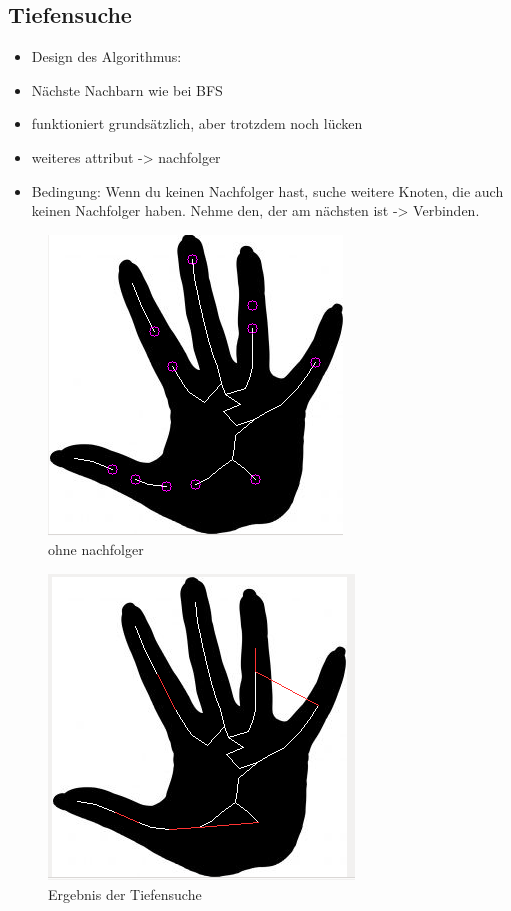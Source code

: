 \subsection{Tiefensuche}
\begin{itemize}
\item Design des Algorithmus:
\item Nächste Nachbarn wie bei BFS
\item funktioniert grundsätzlich, aber trotzdem noch lücken
\item weiteres attribut -> nachfolger
\item Bedingung: Wenn du keinen Nachfolger hast, suche weitere Knoten, die auch keinen Nachfolger haben. Nehme den, der
am nächsten ist -> Verbinden.
\end{itemize}
\begin{figure}
\centering
\includegraphics[width=0.4\linewidth]{./fig/hand-punkte-ohne-nachfolger}
\caption{ohne nachfolger}
\label{fig:hand-punkte-ohne-nachfolger}
\end{figure}
\label{subsec:tiefensuche}
\begin{figure}
\centering
\includegraphics[width=0.4\linewidth]{./fig/hand-DFS}
\caption{Ergebnis der Tiefensuche}
\label{fig:hand-DFS}
\end{figure}